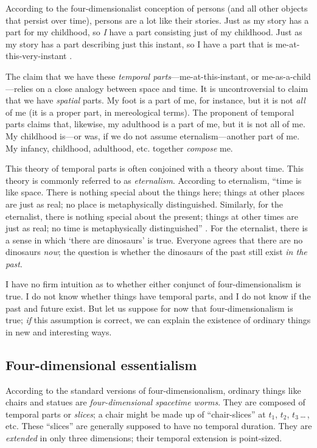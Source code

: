 \documentclass[12pt,twoside]{reedfancy}
\newenvironment{squote}{%
	\begin{spacing}{1}
	\begin{list}{}{%
	\setlength{\labelwidth}{0pt}%
	\rightmargin\leftmargin%
	}
	\item\relax
	}{%
	\end{list}%
	\end{spacing}
	}
\begin{document}
\begin{spacing}{1.25}
\begin{squote}
According to the four-dimensionalist conception of persons (and all
other objects that persist over time), persons are a lot like their
stories.  Just as my story has a part for my childhood, so {\em I}
have a part consisting just of my childhood.  Just as my story has a
part describing just this instant, so I have a part that is
me-at-this-very-instant \citeyearpar[1]{sider2001}.
\end{squote}

The claim that we have these {\em temporal
  parts}---me-at-this-instant, or me-as-a-child---relies on a close
analogy between space and time.  It is uncontroversial to claim that
we have {\em spatial} parts.  My foot is a part of me, for instance,
but it is not {\em all} of me (it is a proper part, in mereological
terms).  The proponent of temporal parts claims that, likewise, my
adulthood is a part of me, but it is not all of me.  My childhood
is---or was, if we do not assume eternalism---another part of me.  My
infancy, childhood, adulthood, etc. together {\em compose} me.

This theory of temporal parts is often conjoined with a theory about
time.  This theory is commonly referred to as {\em eternalism}.
According to eternalism, ``time is like space.  There is nothing
special about the things here; things at other places are just as
real; no place is metaphysically distinguished.  Similarly, for the
eternalist, there is nothing special about the present; things at
other times are just as real; no time is metaphysically
distinguished'' \citep[122]{hinchliff1996}.  For the eternalist, there
is a sense in which `there are dinosaurs' is true.  Everyone agrees
that there are no dinosaurs {\em now}; the question is whether the
dinosaurs of the past still exist {\em in the past}.

I have no firm intuition as to whether either conjunct of
four-dimensionalism is true.  I do not know whether things have
temporal parts, and I do not know if the past and future exist.  But
let us suppose for now that four-dimensionalism is true; {\em if} this
assumption is correct, we can explain the existence of ordinary things
in new and interesting ways.

\subsection{Four-dimensional essentialism}
\label{4de}
According to the standard versions of four-dimensionalism, ordinary
things like chairs and statues are {\em four-dimensional spacetime
  worms}.  They are composed of temporal parts or {\em slices}; a
chair might be made up of ``chair-slices'' at $t_{1}$, $t_{2}$,
$t_{3}$\,\ldots\,, etc.  These ``slices'' are generally supposed to
have no temporal duration.  They are {\em extended} in only three
dimensions; their temporal extension is point-sized.


\end{spacing}
\end{document}

